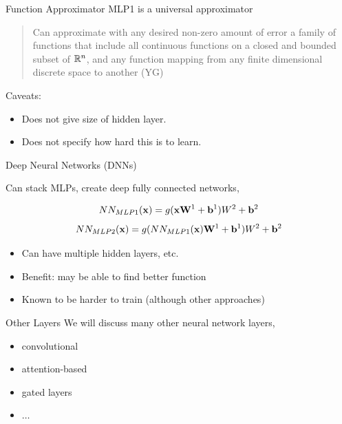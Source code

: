 \documentclass{beamer}
\begin{document}
\begin{frame}{Function Approximator}
  MLP1 is a universal approximator

  \begin{quote}
    Can approximate with any desired non-zero amount of error a family
    of functions that include all continuous functions on a closed and
    bounded subset of $\mathbb{R}^n$, and any function mapping from any
    finite dimensional discrete space to another (YG)
  \end{quote}

  Caveats:
  \begin{itemize}
    \item Does not give size of hidden layer.
    \item Does not specify how hard this is to learn.
  \end{itemize}
\end{frame}

\begin{frame}{Deep Neural Networks (DNNs)}

  Can stack MLPs, create deep fully connected networks,

  \[NN_{MLP1}(\mathbf{x}) =  g(\mathbf{x}\mathbf{W}^1 + \mathbf{b}^1)W^2 + \mathbf{b}^2\]
  \[NN_{MLP2}(\mathbf{x}) =  g(NN_{MLP1}(\mathbf{x}) \mathbf{W}^1 + \mathbf{b}^1)W^2 + \mathbf{b}^2\]

  \begin{itemize}
  \item Can have multiple hidden layers, etc.
  \item Benefit: may be able to find better function
  \item Known to be harder to train (although other approaches)
  \end{itemize}
\end{frame}


\begin{frame}{Other Layers}
  We will discuss many other neural network layers,
  \begin{itemize}
  \item convolutional
  \item attention-based
  \item gated layers
  \item $\ldots$
  \end{itemize}
\end{frame}

{



}
\end{document}
